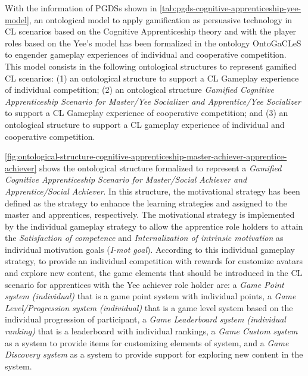 With the information of PGDSs shown in \autoref{tab:pgds-cognitive-apprenticeship-yee-model}, an ontological model to apply gamification as persuasive technology in CL scenarios based on the Cognitive Apprenticeship theory and with the player roles based on the Yee's model has been formalized in the ontology OntoGaCLeS to engender gameplay experiences of individual and cooperative competition.
This model consists in the following ontological structures to represent gamified CL scenarios:
(1) an ontological structure  to support a CL Gameplay experience of individual competition;
(2) an ontological structure {\emph{Gamified Cognitive Apprenticeship Scenario for Master/Yee Socializer and Apprentice/Yee Socializer}} to support a CL Gameplay experience of cooperative competition; and
(3) an ontological structure  to support a CL gameplay experience of individual and cooperative competition. 

\autoref{fig:ontological-structure-cognitive-apprenticeship-master-achiever-apprentice-achiever} shows the ontological structure formalized to represent a \emph{Gamified Cognitive Apprenticeship Scenario for Master/Social Achiever and Apprentice/Social Achiever}.
In this structure, the motivational strategy  has been defined as the strategy to enhance the learning strategies  and  assigned to the master and apprentices, respectively. The motivational strategy  is implemented by the individual gameplay strategy  to allow the apprentice role holders to attain the \emph{Satisfaction of competence} and \emph{Internalization of intrinsic motivation} as individual motivation goals (\emph{I-mot goal}).
According to this individual gameplay strategy, to provide an individual competition with rewards for customize avatars and explore new content, the game elements that should be introduced in the CL scenario for apprentices with the Yee achiever role holder are: a \emph{Game Point system (individual)} that is a game point system with individual points, a \emph{Game Level/Progression system (individual)} that is a game level system based on the individual progression of participant, a \emph{Game Leaderboard system (individual ranking)} that is a leaderboard with individual rankings, a \emph{Game Custom system} as a system to provide items for customizing elements of system, and a \emph{Game Discovery system} as a system to provide support for exploring new content in the system.


